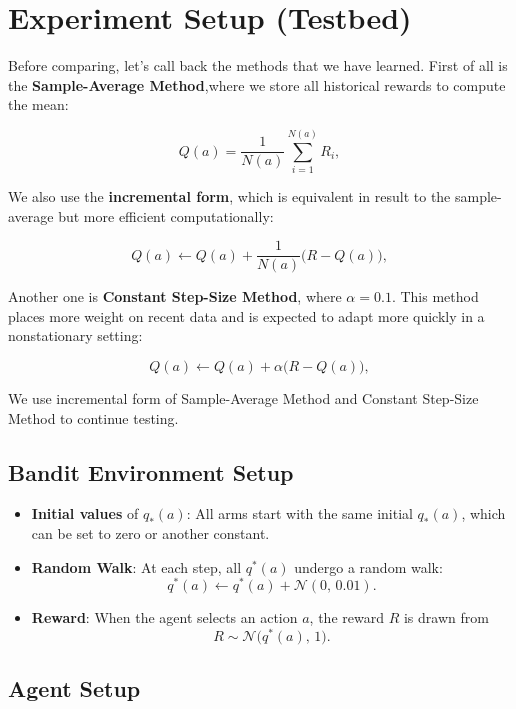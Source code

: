 \documentclass{article}
\begin{document}
\section{Experiment Setup (Testbed)}

Before comparing, let's call back the methods that we have learned. First of all is the \textbf{Sample-Average Method},where we store all historical rewards to compute the mean:

\[
Q(a) = \frac{1}{N(a)} \sum_{i=1}^{N(a)} R_i,
\]

We also use the \textbf{incremental form}, which is equivalent in result to the sample-average but more efficient computationally:

\[
Q(a) \leftarrow Q(a) + \frac{1}{N(a)} \bigl(R - Q(a)\bigr),
\]



Another one is \textbf{Constant Step-Size Method}, where \(\alpha = 0.1\). This method places more weight on recent data and is expected to adapt more quickly in a nonstationary setting:

\[
Q(a) \leftarrow Q(a) + \alpha \bigl(R - Q(a)\bigr),
\]

We use incremental form of Sample-Average Method and Constant Step-Size Method to continue testing.


\subsection{Bandit Environment Setup}

\begin{itemize}

\item \textbf{Initial values} of \(q_*(a)\): All arms start with the same initial \(q_*(a)\), 
which can be set to zero or another constant.

    
    \item {\textbf{Random Walk}}: At each step, all \(q^*(a)\) undergo a random walk:
    \[
    q^*(a) \leftarrow q^*(a) + \mathcal{N}(0,\,0.01).
    \]
    \item {\textbf{Reward}}: When the agent selects an action \(a\), the reward \(R\) is drawn from
    \[
    R \sim \mathcal{N}\bigl(q^*(a),\,1\bigr).
    \]
\end{itemize}

\subsection{Agent Setup}
\end{document}
